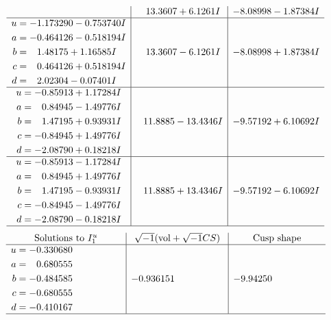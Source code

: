 \documentclass[1p]{elsarticle_modified}
\theoremstyle{definition}
\newcommand{\I}{\sqrt{-1}}
\begin{document}
$$\begin{array}{c|c|c}
 & \phantom{-}13.3607 + 6.1261 I & -8.08998 - 1.87384 I \\ \hline\begin{aligned}
u &= -1.173290 - 0.753740 I \\
a &= -0.464126 - 0.518194 I \\
b &= \phantom{-}1.48175 + 1.16585 I \\
c &= \phantom{-}0.464126 + 0.518194 I \\
d &= \phantom{-}2.02304 - 0.07401 I\end{aligned}
 & \phantom{-}13.3607 - 6.1261 I & -8.08998 + 1.87384 I \\ \hline\begin{aligned}
u &= -0.85913 + 1.17284 I \\
a &= \phantom{-}0.84945 - 1.49776 I \\
b &= \phantom{-}1.47195 + 0.93931 I \\
c &= -0.84945 + 1.49776 I \\
d &= -2.08790 + 0.18218 I\end{aligned}
 & \phantom{-}11.8885 - 13.4346 I & -9.57192 + 6.10692 I \\ \hline\begin{aligned}
u &= -0.85913 - 1.17284 I \\
a &= \phantom{-}0.84945 + 1.49776 I \\
b &= \phantom{-}1.47195 - 0.93931 I \\
c &= -0.84945 - 1.49776 I \\
d &= -2.08790 - 0.18218 I\end{aligned}
 & \phantom{-}11.8885 + 13.4346 I & -9.57192 - 6.10692 I\\
 \hline 
 \end{array}$$\newpage$$\begin{array}{c|c|c}  
\text{Solutions to }I^u_{1}& \I (\text{vol} + \sqrt{-1}CS) & \text{Cusp shape}\\
 \hline 
\begin{aligned}
u &= -0.330680\phantom{ +0.000000I} \\
a &= \phantom{-}0.680555\phantom{ +0.000000I} \\
b &= -0.484585\phantom{ +0.000000I} \\
c &= -0.680555\phantom{ +0.000000I} \\
d &= -0.410167\phantom{ +0.000000I}\end{aligned}
 & -0.936151\phantom{ +0.000000I} & -9.94250\phantom{ +0.000000I}\\
 \hline 
 \end{array}$$\newpage\newpage\renewcommand{\arraystretch}{1}
\end{document}
